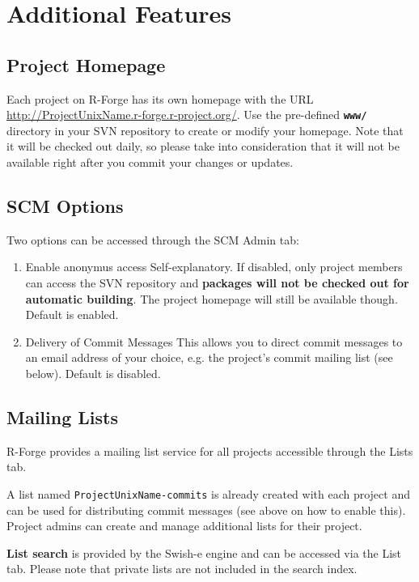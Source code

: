 \documentclass[a4paper]{report}
\begin{document}
\section{Additional Features}

\subsection{Project Homepage}
Each project on R-Forge has its own homepage with the URL
\url{http://ProjectUnixName.r-forge.r-project.org/}. Use the
pre-defined \textbf{\texttt{www/}} directory in your SVN repository to
create or modify your homepage. Note that it will be checked out
daily, so please take 
into consideration that it will not be available right after you
commit your changes or updates. 


\subsection{SCM Options}
Two options can be accessed through the SCM Admin tab:
\begin{enumerate}
\item{Enable anonymus access} Self-explanatory. If disabled, only
  project members can access the SVN repository and  \textbf{packages
    will not be checked out for automatic building}. The project
  homepage will still be available though. Default is enabled.

\item{Delivery of Commit Messages} This allows you to direct commit
  messages to an email address of your choice, e.g. the project's
  commit mailing list (see below). Default is disabled.
\end{enumerate}


\subsection{Mailing Lists}
R-Forge provides a mailing list service for all projects accessible through the Lists tab. 

A list named \texttt{ProjectUnixName-commits} is already created with each project and can be used for distributing commit messages (see above on how to enable this). Project admins can create and manage additional lists for their project. 

\textbf{List search} is provided by the Swish-e engine and can be accessed via the List tab. Please note that private lists are not included in the search index. 
\end{document}
